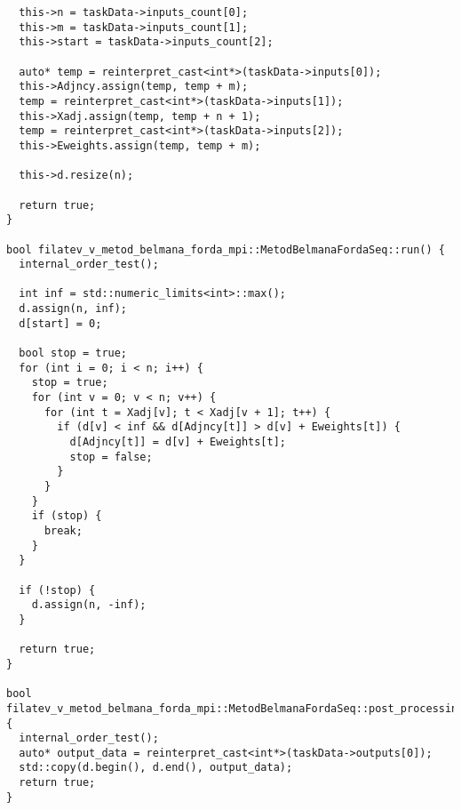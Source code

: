 \documentclass[a4paper, 14pt]{article}
\begin{document}
\begin{verbatim}
  this->n = taskData->inputs_count[0];
  this->m = taskData->inputs_count[1];
  this->start = taskData->inputs_count[2];

  auto* temp = reinterpret_cast<int*>(taskData->inputs[0]);
  this->Adjncy.assign(temp, temp + m);
  temp = reinterpret_cast<int*>(taskData->inputs[1]);
  this->Xadj.assign(temp, temp + n + 1);
  temp = reinterpret_cast<int*>(taskData->inputs[2]);
  this->Eweights.assign(temp, temp + m);

  this->d.resize(n);

  return true;
}

bool filatev_v_metod_belmana_forda_mpi::MetodBelmanaFordaSeq::run() {
  internal_order_test();

  int inf = std::numeric_limits<int>::max();
  d.assign(n, inf);
  d[start] = 0;

  bool stop = true;
  for (int i = 0; i < n; i++) {
    stop = true;
    for (int v = 0; v < n; v++) {
      for (int t = Xadj[v]; t < Xadj[v + 1]; t++) {
        if (d[v] < inf && d[Adjncy[t]] > d[v] + Eweights[t]) {
          d[Adjncy[t]] = d[v] + Eweights[t];
          stop = false;
        }
      }
    }
    if (stop) {
      break;
    }
  }

  if (!stop) {
    d.assign(n, -inf);
  }

  return true;
}

bool filatev_v_metod_belmana_forda_mpi::MetodBelmanaFordaSeq::post_processing() {
  internal_order_test();
  auto* output_data = reinterpret_cast<int*>(taskData->outputs[0]);
  std::copy(d.begin(), d.end(), output_data);
  return true;
}

	\end{verbatim}



    
\end{document}
